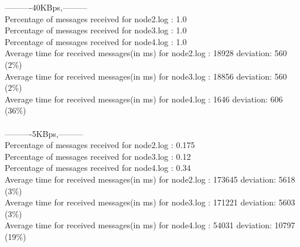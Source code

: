         ----------40KBps,---------\\
        Percentage of messages received for node2.log : 1.0\\
        Percentage of messages received for node3.log : 1.0\\
        Percentage of messages received for node4.log : 1.0\\
        Average time for received messages(in ms) for  node2.log : 18928 	deviation: 560 (2\%)\\
        Average time for received messages(in ms) for  node3.log : 18856 	deviation: 560 (2\%)\\
        Average time for received messages(in ms) for  node4.log : 1646 	deviation: 606 (36\%)\\\\
        ----------5KBps,---------\\
        Percentage of messages received for node2.log : 0.175\\
        Percentage of messages received for node3.log : 0.12\\
        Percentage of messages received for node4.log : 0.34\\
        Average time for received messages(in ms) for  node2.log : 173645 	deviation: 5618 (3\%)\\
        Average time for received messages(in ms) for  node3.log : 171221 	deviation: 5603 (3\%)\\
        Average time for received messages(in ms) for  node4.log : 54031 	deviation: 10797 (19\%)\\\\
